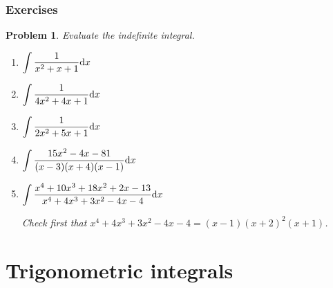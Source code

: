\documentclass[12pt]{book}
\newtheorem{problem}[theorem]{Problem}
\begin{document}
\subsubsection{Exercises}
\begin{problem}
Evaluate the indefinite integral.
\begin{enumerate}
\item $\displaystyle \int \frac1{x^2+x+1}{\normalfont \text{d}} x$
\item $\displaystyle \int \frac1{4x^2+4x+1}{\normalfont \text{d}} x$
\item $\displaystyle \int \frac1{2x^2+5x+1}{\normalfont \text{d}} x$
\item $\displaystyle \int \frac{15x^2-4x-81}{ (x-3)(x+4) (x-1) } {\normalfont \text{d}} x$
\item $\displaystyle \int \frac {x^{4} +10x^{3}+ 18x^{2}+ 2x- 13}{ x^{4} +4x^{3}+3x^{2}-4x-4}{\normalfont \text{d}} x$

Check first that $x^{4}+4x^{3} +3x^{2} -4x -4=(x-1)(x+2)^2(x+1)$.
\end{enumerate}
\end{problem}

\section{Trigonometric integrals}\label{secTrigIntegrals}
\end{document}
